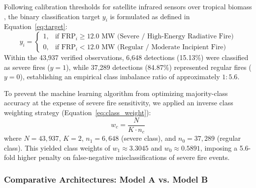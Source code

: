 Following calibration thresholds for satellite infrared sensors over tropical biomass \citep{RobertsWooster2008JGR, Wooster2018NatGeosci}, the binary classification target $y_i$ is formulated as defined in Equation~\eqref{eq:target}:
\begin{equation}
y_i = \begin{cases} 
1, & \text{if } \text{FRP}_i \ge 12.0\text{ MW (Severe / High-Energy Radiative Fire)} \\ 
0, & \text{if } \text{FRP}_i < 12.0\text{ MW (Regular / Moderate Incipient Fire)} 
\end{cases}
\label{eq:target}
\end{equation}
Within the 43,937 verified observations, 6,648 detections (15.13\%) were classified as severe fires ($y=1$), while 37,289 detections (84.87\%) represented regular fires ($y=0$), establishing an empirical class imbalance ratio of approximately $1 : 5.6$.

To prevent the machine learning algorithm from optimizing majority-class accuracy at the expense of severe fire sensitivity, we applied an inverse class weighting strategy (Equation~\eqref{eq:class_weight}):
\begin{equation}
w_c = \frac{N}{K \cdot n_c}
\label{eq:class_weight}
\end{equation}
where $N = 43,937$, $K = 2$, $n_1 = 6,648$ (severe class), and $n_0 = 37,289$ (regular class). This yielded class weights of $w_1 \approx 3.3045$ and $w_0 \approx 0.5891$, imposing a 5.6-fold higher penalty on false-negative misclassifications of severe fire events.

\subsubsection{Comparative Architectures: Model A vs. Model B}
\label{subsubsec:model_architectures}

